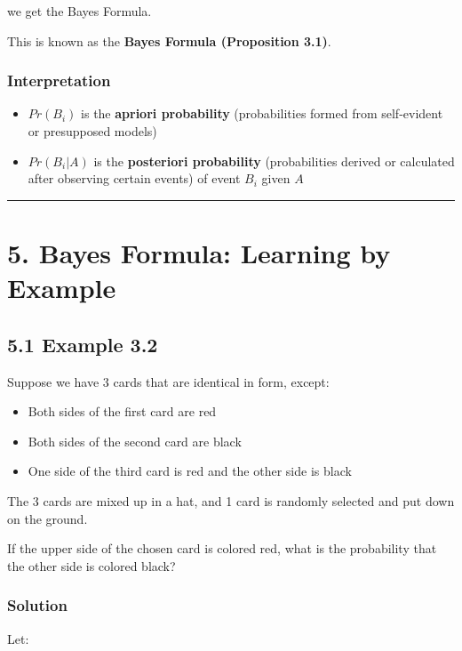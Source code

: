 \documentclass[12pt]{article}
\begin{document}
we get the Bayes Formula.

This is known as the \textbf{Bayes Formula (Proposition 3.1)}.

\subsubsection*{\textbf{Interpretation}}

\begin{itemize}
    \item $Pr(B_i)$ is the \textbf{apriori probability} (probabilities formed from self-evident or presupposed models)
    \item $Pr(B_i|A)$ is the \textbf{posteriori probability} (probabilities derived or calculated after observing certain events) of event $B_i$ given $A$
\end{itemize}

\hrule
\vspace{1em}

\section*{\textbf{5. Bayes Formula: Learning by Example}}

\subsection*{\textbf{5.1 Example 3.2}}

Suppose we have 3 cards that are identical in form, except:

\begin{itemize}
    \item Both sides of the first card are red
    \item Both sides of the second card are black
    \item One side of the third card is red and the other side is black
\end{itemize}

The 3 cards are mixed up in a hat, and 1 card is randomly selected and put down on the ground.

If the upper side of the chosen card is colored red, what is the probability that the other side is colored black?

\subsubsection*{\textbf{Solution}}

Let:
\end{document}
